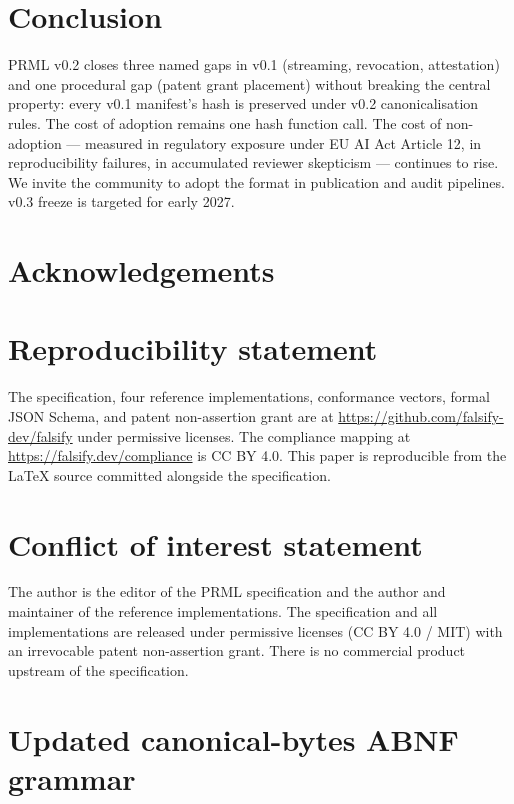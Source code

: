 \documentclass[11pt, a4paper]{article}
\begin{document}
\section{Conclusion}
\label{sec:conclusion}

PRML v0.2 closes three named gaps in v0.1 (streaming, revocation, attestation) and one procedural gap (patent grant placement) without breaking the central property: every v0.1 manifest's hash is preserved under v0.2 canonicalisation rules. The cost of adoption remains one hash function call. The cost of non-adoption --- measured in regulatory exposure under EU AI Act Article 12, in reproducibility failures, in accumulated reviewer skepticism --- continues to rise. We invite the community to adopt the format in publication and audit pipelines. v0.3 freeze is targeted for early 2027.

\section*{Acknowledgements}


\section*{Reproducibility statement}

The specification, four reference implementations, conformance vectors, formal JSON Schema, and patent non-assertion grant are at \url{https://github.com/falsify-dev/falsify} under permissive licenses. The compliance mapping at \url{https://falsify.dev/compliance} is CC BY 4.0. This paper is reproducible from the LaTeX source committed alongside the specification.

\section*{Conflict of interest statement}

The author is the editor of the PRML specification and the author and maintainer of the reference implementations. The specification and all implementations are released under permissive licenses (CC BY 4.0 / MIT) with an irrevocable patent non-assertion grant. There is no commercial product upstream of the specification.

\appendix

\section{Updated canonical-bytes ABNF grammar}
\label{app:abnf}
\end{document}
